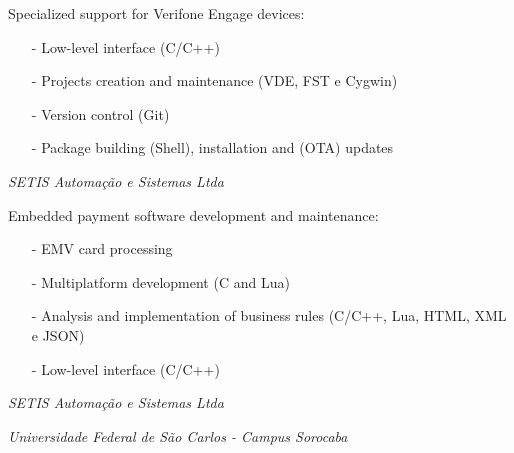 \documentclass[11pt,a4paper,sans]{moderncv}
\begin{document}

\hspace{1.25cm} \begin{minipage}[htb]{\linewidth - 1.25cm}
    Specialized support for Verifone Engage devices:
    \begin{itemize}
        \item[-] Low-level interface (C/C++)
        \item[-] Projects creation and maintenance (VDE, FST e Cygwin)
        \item[-] Version control (Git)
        \item[-] Package building (Shell), installation and (OTA) updates
    \end{itemize}
\end{minipage}

\vspace{\baselineskip}

\hspace{1.25cm} \textit{SETIS Automação e Sistemas Ltda}


\hspace{1.25cm} \begin{minipage}[htb]{\linewidth - 1.25cm}
    Embedded payment software development and maintenance:
    \begin{itemize}
        \item[-] EMV card processing
        \item[-] Multiplatform development (C and Lua)
        \item[-] Analysis and implementation of business rules (C/C++, Lua,
                 HTML, XML e JSON)
        \item[-] Low-level interface (C/C++)
    \end{itemize}
\end{minipage}

\vspace{\baselineskip}

\hspace{1.25cm} \textit{SETIS Automação e Sistemas Ltda}


\vspace{\baselineskip}

\hspace{1.25cm} \textit{Universidade Federal de São Carlos - Campus Sorocaba}
\end{document}
